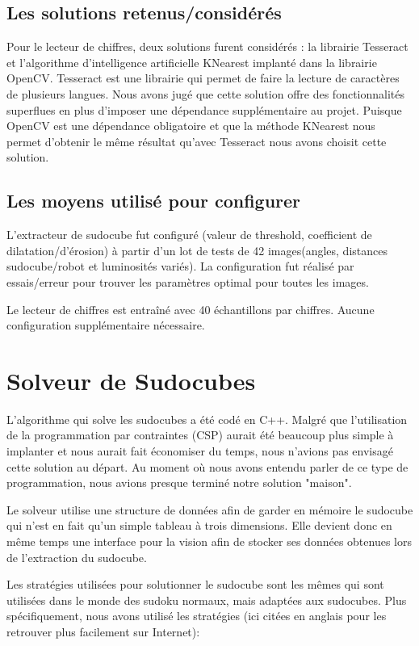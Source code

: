 \subsection{Les solutions retenus/considérés}
Pour le lecteur de chiffres, deux solutions furent considérés : la librairie Tesseract et l'algorithme d'intelligence artificielle KNearest implanté dans la librairie OpenCV. Tesseract est une librairie qui permet de faire la lecture de caractères de plusieurs langues. Nous avons jugé que cette solution offre des fonctionnalités superflues en plus d'imposer une dépendance supplémentaire au projet. Puisque OpenCV est une dépendance obligatoire et que la méthode KNearest nous permet d'obtenir le même résultat qu'avec Tesseract nous avons choisit cette solution. 

\subsection{Les moyens utilisé pour configurer}
L'extracteur de sudocube fut configuré (valeur de threshold, coefficient de dilatation/d'érosion) à partir d'un lot de tests de 42 images(angles, distances sudocube/robot et luminosités variés). La configuration fut réalisé par essais/erreur pour trouver les paramètres optimal pour toutes les images.

Le lecteur de chiffres est entraîné avec 40 échantillons par chiffres. Aucune configuration supplémentaire nécessaire.

\section{Solveur de Sudocubes}
L'algorithme qui solve les sudocubes a été codé en C++. Malgré que l'utilisation de la programmation par contraintes (CSP) aurait été beaucoup plus simple à implanter et nous aurait fait économiser du temps, nous n'avions pas envisagé cette solution au départ. Au moment où nous avons entendu parler de ce type de programmation, nous avions presque terminé notre solution "maison". 

Le solveur utilise une structure de données afin de garder en mémoire le sudocube qui n'est en fait qu'un simple tableau à trois dimensions. Elle devient donc en même temps une interface pour la vision afin de stocker ses données obtenues lors de l'extraction du sudocube.

Les stratégies utilisées pour solutionner le sudocube sont les mêmes qui sont utilisées dans le monde des sudoku normaux, mais adaptées aux sudocubes. Plus spécifiquement, nous avons utilisé les stratégies (ici citées en anglais pour les retrouver plus facilement sur Internet):\newline

